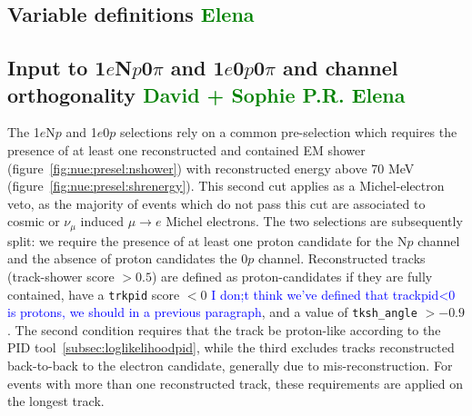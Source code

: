\documentclass[a4paper]{article}
\newcommand{\npsel}{1$e$N$p$0$\pi$ }
\newcommand{\zpsel}{1$e$0$p$0$\pi$ }
\begin{document}
\subsection{Variable definitions \textcolor{green}{Elena}}
\label{sec:nueselection:variables}

\clearpage

\subsection{Input to \npsel and \zpsel and channel orthogonality \textcolor{green}{David + Sophie P.R. Elena} }
\label{sec:nueselection:inputs}

The 1$e$N$p$ and 1$e$0$p$ selections rely on a common pre-selection which requires the presence of at least one reconstructed and contained EM shower (figure~\ref{fig:nue:presel:nshower}) with reconstructed energy above 70 MeV (figure~\ref{fig:nue:presel:shrenergy}). This second cut applies as a Michel-electron veto, as the majority of events which do not pass this cut are associated to cosmic or $\nu_{\mu}$ induced $\mu \rightarrow e$ Michel electrons. The two selections are subsequently split: we require the presence of at least one proton candidate for the N$p$ channel and the absence of proton candidates the 0$p$ channel. Reconstructed tracks (track-shower score $> 0.5$) are defined as proton-candidates if they are fully contained,  have a \texttt{trkpid} score $< 0$ \textcolor{blue}{I don;t think we've defined that trackpid<0 is protons, we should in a previous paragraph}, and a value of \texttt{tksh\_angle} $> -0.9$. The second condition requires that the track be proton-like according to the PID tool~\ref{subsec:loglikelihoodpid}, while the third excludes tracks reconstructed back-to-back to the electron candidate, generally due to mis-reconstruction. For events with more than one reconstructed track, these requirements are applied on the longest track.
\end{document}

